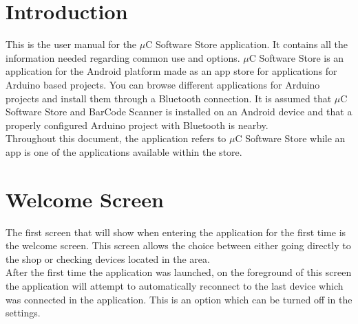 \chapter{Introduction}
This is the user manual for the $\mu$C Software Store application. It contains all the information needed regarding common use and options. $\mu$C Software Store is an application for the Android platform made as an app store for applications for Arduino based projects. You can browse different applications for Arduino projects and install them through a Bluetooth connection. It is assumed that $\mu$C Software Store and BarCode Scanner is installed on an Android device and that a properly configured Arduino project with Bluetooth is nearby.\\
\newline
Throughout this document, the application refers to $\mu$C Software Store while an app is one of the applications available within the store.

\chapter{Welcome Screen}
The first screen that will show when entering the application for the first time is the welcome screen. This screen allows the choice between either going directly to the shop or checking devices located in the area. \\

\newline
After the first time the application was launched, on the foreground of this screen the application will attempt to automatically reconnect to the last device which was connected in the application. This is an option which can be turned off in the settings. 

